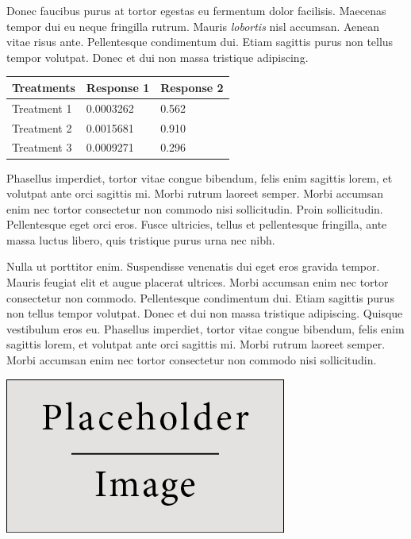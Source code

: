 \documentclass[a0,landscape]{a0poster}
\begin{document}
\begin{multicols}{3}
Donec faucibus purus at tortor egestas eu fermentum dolor facilisis. Maecenas tempor dui eu neque fringilla rutrum. Mauris \emph{lobortis} nisl accumsan. Aenean vitae risus ante. Pellentesque condimentum dui. Etiam sagittis purus non tellus tempor volutpat. Donec et dui non massa tristique adipiscing.
%
\begin{table} %
\begin{tabular}{l l l}
\toprule
\textbf{Treatments} & \textbf{Response 1} & \textbf{Response 2}\\
\midrule
Treatment 1 & 0.0003262 & 0.562 \\
Treatment 2 & 0.0015681 & 0.910 \\
Treatment 3 & 0.0009271 & 0.296 \\
\bottomrule
\end{tabular}
\end{table}
%
Phasellus imperdiet, tortor vitae congue bibendum, felis enim sagittis lorem, et volutpat ante orci sagittis mi. Morbi rutrum laoreet semper. Morbi accumsan enim nec tortor consectetur non commodo nisi sollicitudin. Proin sollicitudin. Pellentesque eget orci eros. Fusce ultricies, tellus et pellentesque fringilla, ante massa luctus libero, quis tristique purus urna nec nibh.

Nulla ut porttitor enim. Suspendisse venenatis dui eget eros gravida tempor. Mauris feugiat elit et augue placerat ultrices. Morbi accumsan enim nec tortor consectetur non commodo. Pellentesque condimentum dui. Etiam sagittis purus non tellus tempor volutpat. Donec et dui non massa tristique adipiscing. Quisque vestibulum eros eu. Phasellus imperdiet, tortor vitae congue bibendum, felis enim sagittis lorem, et volutpat ante orci sagittis mi. Morbi rutrum laoreet semper. Morbi accumsan enim nec tortor consectetur non commodo nisi sollicitudin.

\begin{center}\vspace{1cm}
\includegraphics[width=0.8\linewidth]{placeholder}
\end{center}\vspace{1cm}


\end{multicols}
\end{document}
